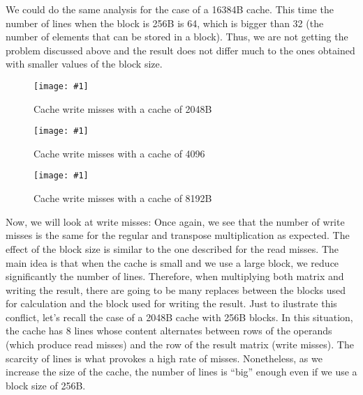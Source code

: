 \documentclass{article}
\newcommand{\myFigure}[4]{%
    \begin{figure}[!ht]
        \texttt{[image: \#1]}
        \centering
        \caption{#2}
        \label{#3}
    \end{figure}
}
\begin{document}
We could do the same analysis for the case of a 16384B cache. This time the number of lines when the block is 256B is 64, which is bigger than 32 (the number of elements that can be stored in a block). Thus, we are not getting the problem discussed above and the result does not differ much to the ones obtained with smaller values of the block size.



\myFigure{../material_P3/protect_out4/BlockSize_2048/cache_escritura.png}{Cache write misses with a cache of 2048B}{block_2048_esc}{0.55}


\myFigure{../material_P3/protect_out4/BlockSize_4096/cache_escritura.png}{Cache write misses with a cache of 4096}{block_4096_esc}{0.55}

\myFigure{../material_P3/protect_out4/BlockSize_8192/cache_escritura.png}{Cache write misses with a cache of 8192B}{block_8192B_esc}{0.55}

\par

Now, we will look at write misses:
Once again, we see that the number of write misses is the same for the regular and transpose multiplication as expected. The effect of the block size is similar to the one described for the read misses. The main idea is that when the cache is small and we use a large block, we reduce significantly the number of lines. Therefore, when multiplying both matrix and writing the result, there are going to be many replaces between the blocks used for calculation and the block used for writing the result. Just to ilustrate this conflict, let's recall the case of a 2048B cache with 256B blocks. In this situation, the cache has 8 lines whose content alternates between rows of the operands (which produce read misses) and the row of the result matrix (write misses). The scarcity of lines is what provokes a high rate of misses. Nonetheless, as we increase the size of the cache, the number of lines is ``big'' enough even if we use a block size of 256B.
\end{document}
